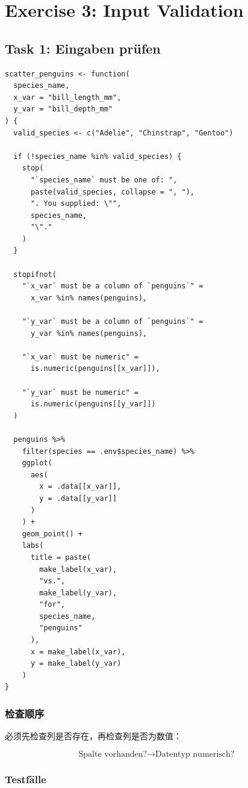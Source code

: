 \documentclass[11pt,a4paper]{ctexart}
\begin{document}
\section{Exercise 3: Input Validation}

\subsection{Task 1: Eingaben prüfen}

\begin{lstlisting}
scatter_penguins <- function(
  species_name,
  x_var = "bill_length_mm",
  y_var = "bill_depth_mm"
) {
  valid_species <- c("Adelie", "Chinstrap", "Gentoo")

  if (!species_name %in% valid_species) {
    stop(
      "`species_name` must be one of: ",
      paste(valid_species, collapse = ", "),
      ". You supplied: \"",
      species_name,
      "\"."
    )
  }

  stopifnot(
    "`x_var` must be a column of `penguins`" =
      x_var %in% names(penguins),

    "`y_var` must be a column of `penguins`" =
      y_var %in% names(penguins),

    "`x_var` must be numeric" =
      is.numeric(penguins[[x_var]]),

    "`y_var` must be numeric" =
      is.numeric(penguins[[y_var]])
  )

  penguins %>%
    filter(species == .env$species_name) %>%
    ggplot(
      aes(
        x = .data[[x_var]],
        y = .data[[y_var]]
      )
    ) +
    geom_point() +
    labs(
      title = paste(
        make_label(x_var),
        "vs.",
        make_label(y_var),
        "for",
        species_name,
        "penguins"
      ),
      x = make_label(x_var),
      y = make_label(y_var)
    )
}
\end{lstlisting}

\subsubsection*{检查顺序}

必须先检查列是否存在，再检查列是否为数值：

\[
\text{Spalte vorhanden?}
\longrightarrow
\text{Datentyp numerisch?}
\]

\subsubsection*{Testfälle}
\end{document}
